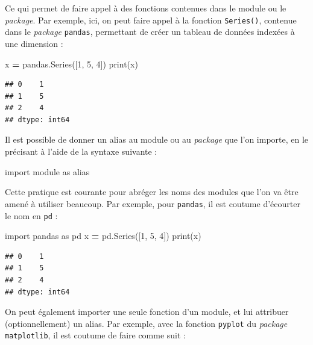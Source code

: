 \documentclass[12pt,]{book}
\newenvironment{Shaded}{\begin{snugshade}}{\end{snugshade}}
\newcommand{\DecValTok}[1]{\textcolor[rgb]{0.00,0.00,0.81}{#1}}
\newcommand{\ImportTok}[1]{#1}
\newcommand{\OperatorTok}[1]{\textcolor[rgb]{0.81,0.36,0.00}{\textbf{#1}}}
\newcommand{\BuiltInTok}[1]{#1}
\newcommand{\NormalTok}[1]{#1}
\numberwithin{equation}{section}
\numberwithin{countremarque}{section}
\begin{document}
Ce qui permet de faire appel à des fonctions contenues dans le module ou
le \emph{package}. Par exemple, ici, on peut faire appel à la fonction
\texttt{Series()}, contenue dans le \emph{package} \texttt{pandas},
permettant de créer un tableau de données indexées à une dimension :

\begin{Shaded}
\begin{Highlighting}[]
\NormalTok{x }\OperatorTok{=}\NormalTok{ pandas.Series([}\DecValTok{1}\NormalTok{, }\DecValTok{5}\NormalTok{, }\DecValTok{4}\NormalTok{])}
\BuiltInTok{print}\NormalTok{(x)}
\end{Highlighting}
\end{Shaded}

\begin{lstlisting}
## 0    1
## 1    5
## 2    4
## dtype: int64
\end{lstlisting}

Il est possible de donner un alias au module ou au \emph{package} que
l'on importe, en le précisant à l'aide de la syntaxe suivante :

\begin{Shaded}
\begin{Highlighting}[]
\ImportTok{import}\NormalTok{ module }\ImportTok{as}\NormalTok{ alias}
\end{Highlighting}
\end{Shaded}

Cette pratique est courante pour abréger les noms des modules que l'on
va être amené à utiliser beaucoup. Par exemple, pour \texttt{pandas}, il
est coutume d'écourter le nom en \texttt{pd} :

\begin{Shaded}
\begin{Highlighting}[]
\ImportTok{import}\NormalTok{ pandas }\ImportTok{as}\NormalTok{ pd}
\NormalTok{x }\OperatorTok{=}\NormalTok{ pd.Series([}\DecValTok{1}\NormalTok{, }\DecValTok{5}\NormalTok{, }\DecValTok{4}\NormalTok{])}
\BuiltInTok{print}\NormalTok{(x)}
\end{Highlighting}
\end{Shaded}

\begin{lstlisting}
## 0    1
## 1    5
## 2    4
## dtype: int64
\end{lstlisting}

On peut également importer une seule fonction d'un module, et lui
attribuer (optionnellement) un alias. Par exemple, avec la fonction
\texttt{pyplot} du \emph{package} \texttt{matplotlib}, il est coutume de
faire comme suit :
\end{document}
